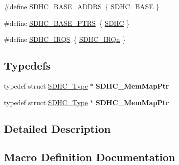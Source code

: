 \begin{DoxyCompactItemize}
\item 
\#define \hyperlink{group__SDHC__Peripheral__Access__Layer_gac247c4777a4c8704d90501a085108593}{S\+D\+H\+C\+\_\+\+B\+A\+S\+E\+\_\+\+A\+D\+D\+RS}~\{ \hyperlink{group__SDHC__Peripheral__Access__Layer_gae62cd2bf9b9c484123918db65cc4834b}{S\+D\+H\+C\+\_\+\+B\+A\+SE} \}
\item 
\#define \hyperlink{group__SDHC__Peripheral__Access__Layer_gaba68469bfde58472af9853b68fee61de}{S\+D\+H\+C\+\_\+\+B\+A\+S\+E\+\_\+\+P\+T\+RS}~\{ \hyperlink{group__SDHC__Peripheral__Access__Layer_gadfa975565f8f38eb596ca3ed92df30c8}{S\+D\+HC} \}
\item 
\#define \hyperlink{group__SDHC__Peripheral__Access__Layer_gac8a2a352713668bfc1ee4dc28bb16783}{S\+D\+H\+C\+\_\+\+I\+R\+QS}~\{ \hyperlink{group__Interrupt__vector__numbers_gga666eb0caeb12ec0e281415592ae89083a3ef698a0344956fa80957f89eded8f95}{S\+D\+H\+C\+\_\+\+I\+R\+Qn} \}
\end{DoxyCompactItemize}
\subsection*{Typedefs}
\begin{DoxyCompactItemize}
\item 
typedef struct \hyperlink{structSDHC__Type}{S\+D\+H\+C\+\_\+\+Type} $\ast$ {\bfseries S\+D\+H\+C\+\_\+\+Mem\+Map\+Ptr}\hypertarget{group__SDHC__Peripheral__Access__Layer_gaaff0703de1cb46ef458304d26bbd33eb}{}\label{group__SDHC__Peripheral__Access__Layer_gaaff0703de1cb46ef458304d26bbd33eb}

\item 
typedef struct \hyperlink{structSDHC__Type}{S\+D\+H\+C\+\_\+\+Type} $\ast$ {\bfseries S\+D\+H\+C\+\_\+\+Mem\+Map\+Ptr}\hypertarget{group__SDHC__Peripheral__Access__Layer_gaaff0703de1cb46ef458304d26bbd33eb}{}\label{group__SDHC__Peripheral__Access__Layer_gaaff0703de1cb46ef458304d26bbd33eb}

\end{DoxyCompactItemize}


\subsection{Detailed Description}


\subsection{Macro Definition Documentation}

